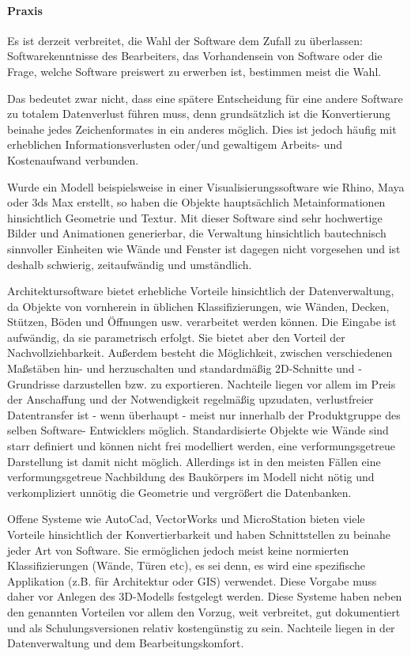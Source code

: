 \paragraph{Praxis}
Es ist derzeit verbreitet, die Wahl der Software dem Zufall zu überlassen: Softwarekenntnisse des Bearbeiters, das Vorhandensein von Software oder die Frage, welche Software preiswert zu erwerben ist, bestimmen meist die Wahl.

Das bedeutet zwar nicht, dass eine spätere Entscheidung für eine andere Software zu totalem Datenverlust führen muss, denn grundsätzlich ist die Konvertierung beinahe jedes Zeichenformates in ein anderes möglich. Dies ist jedoch häufig mit erheblichen Informationsverlusten oder/und gewaltigem Arbeits- und Kostenaufwand verbunden.

Wurde ein Modell beispielsweise in einer Visualisierungssoftware wie Rhino, Maya oder 3ds Max erstellt, so haben die Objekte hauptsächlich Metainformationen hinsichtlich Geometrie und Textur. Mit dieser Software sind sehr hochwertige Bilder und Animationen generierbar, die Verwaltung hinsichtlich bautechnisch sinnvoller  Einheiten wie Wände und Fenster ist dagegen nicht vorgesehen und ist deshalb schwierig, zeitaufwändig und umständlich.

Architektursoftware bietet erhebliche Vorteile hinsichtlich der Datenverwaltung, da  Objekte von vornherein in üblichen Klassifizierungen, wie Wänden, Decken, Stützen, Böden und Öffnungen usw. verarbeitet werden können. Die Eingabe ist aufwändig, da sie parametrisch erfolgt. Sie bietet aber den Vorteil der Nachvollziehbarkeit. Außerdem besteht die Möglichkeit, zwischen verschiedenen Maßstäben hin- und herzuschalten und standardmäßig 2D-Schnitte und -Grundrisse darzustellen bzw. zu exportieren. Nachteile liegen vor allem im Preis der Anschaffung und der Notwendigkeit regelmäßig upzudaten, verlustfreier Datentransfer ist - wenn überhaupt - meist nur innerhalb der Produktgruppe des selben Software- Entwicklers möglich. Standardisierte Objekte wie Wände sind starr definiert und können nicht frei modelliert werden, eine verformungsgetreue Darstellung ist damit nicht möglich. Allerdings ist in den meisten Fällen eine verformungsgetreue Nachbildung des Baukörpers im Modell nicht nötig und verkompliziert unnötig die Geometrie und vergrößert die Datenbanken.

Offene Systeme wie AutoCad, VectorWorks und MicroStation bieten viele Vorteile hinsichtlich der Konvertierbarkeit und haben Schnittstellen zu beinahe jeder Art von Software. Sie ermöglichen jedoch meist keine normierten Klassifizierungen (Wände, Türen etc), es sei denn, es wird eine spezifische Applikation (z.B. für Architektur oder GIS) verwendet. Diese Vorgabe muss daher vor Anlegen des 3D-Modells festgelegt werden. Diese Systeme haben neben den genannten Vorteilen vor allem den Vorzug, weit verbreitet, gut dokumentiert und als Schulungsversionen relativ kostengünstig zu sein. Nachteile liegen in der Datenverwaltung und dem Bearbeitungskomfort.

